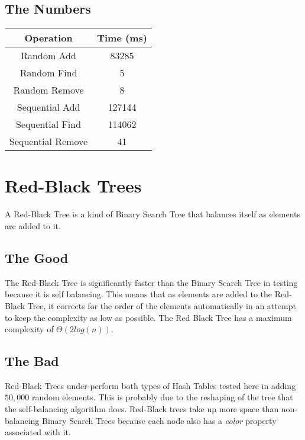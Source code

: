 \documentclass{muformallab}
\begin{document}
  \subsection{The Numbers}

  \begin{center}
    \begin{tabular}{c c}
      Operation & Time (ms) \\
      \hline
      Random Add & 83285 \\
      Random Find & 5 \\
      Random Remove & 8 \\
      Sequential Add & 127144 \\
      Sequential Find & 114062 \\
      Sequential Remove & 41 \\
    \end{tabular}
  \end{center}

  \section{Red-Black Trees}

  A Red-Black Tree is a kind of Binary Search Tree that balances itself as
  elements are added to it.

  \subsection{The Good}

  The Red-Black Tree is significantly faster than the Binary Search Tree
  in testing because it is self balancing. This means that as elements are
  added to the Red-Black Tree, it corrects for the order of the elements
  automatically in an attempt to keep the complexity as low as possible.
  The Red Black Tree has a maximum complexity of $\Theta \left( 2 log
  \left( n \right) \right)$.

  \subsection{The Bad}

  Red-Black Trees under-perform both types of Hash Tables tested here in
  adding $50,000$ random elements. This is probably due to the reshaping
  of the tree that the self-balancing algorithm does. Red-Black trees take
  up more space than non-balancing Binary Search Trees because each node
  also has a \textit{color} property associated with it.
\end{document}
